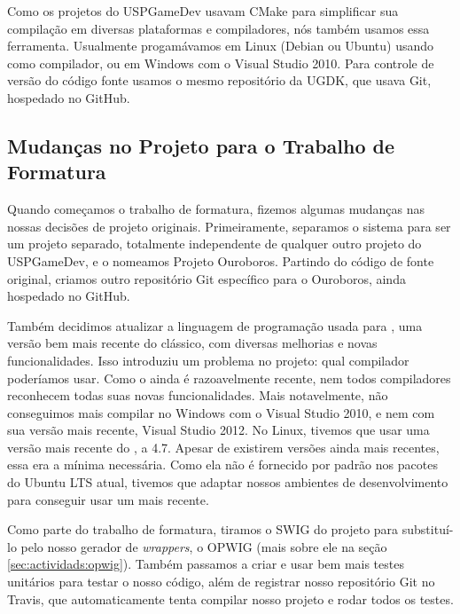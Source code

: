   Como os projetos do USPGameDev usavam CMake para simplificar sua compilação
  em diversas plataformas e compiladores, nós também usamos essa ferramenta.
  Usualmente progamávamos em Linux (Debian ou Ubuntu) usando  como compilador,
  ou em Windows com o Visual Studio 2010. Para controle de versão do código fonte
  usamos o mesmo repositório da UGDK, que usava Git, hospedado no GitHub.

  
  \subsection{Mudanças no Projeto para o Trabalho de Formatura}
  Quando começamos o trabalho de formatura, fizemos algumas mudanças nas nossas
  decisões de projeto originais. Primeiramente, separamos o sistema para ser um
  projeto separado, totalmente independente de qualquer outro projeto do
  USPGameDev, e o nomeamos Projeto Ouroboros. Partindo do código de fonte
  original, criamos outro repositório Git específico para o Ouroboros, ainda
  hospedado no GitHub.
  
  Também decidimos atualizar a linguagem de programação usada para ,
  uma versão bem mais recente do \CXX{} clássico, com diversas melhorias e
  novas funcionalidades. Isso introduziu um problema no projeto: qual compilador
  poderíamos usar. Como o  ainda é razoavelmente recente, nem todos
  compiladores reconhecem todas suas novas funcionalidades. Mais notavelmente,
  não conseguimos mais compilar no Windows com o Visual Studio 2010, e nem com
  sua versão mais recente, Visual Studio 2012. No Linux, tivemos que usar uma
  versão mais recente do , a 4.7. Apesar de existirem versões ainda mais 
  recentes, essa era a mínima necessária. Como ela não é fornecido por padrão
  nos pacotes do Ubuntu LTS\footnotemark{} atual, tivemos que adaptar nossos
  ambientes de desenvolvimento para conseguir usar um  mais recente.


  Como parte do trabalho de formatura, tiramos o SWIG do projeto para substituí-lo
  pelo nosso gerador de \textit{wrappers}, o OPWIG (mais sobre ele na seção 
  \ref{sec:actividads:opwig}). Também passamos a criar e usar bem mais testes
  unitários para testar o nosso código, além de registrar nosso repositório Git
  no Travis\footnotemark, que automaticamente tenta compilar nosso projeto e
  rodar todos os testes.
  
